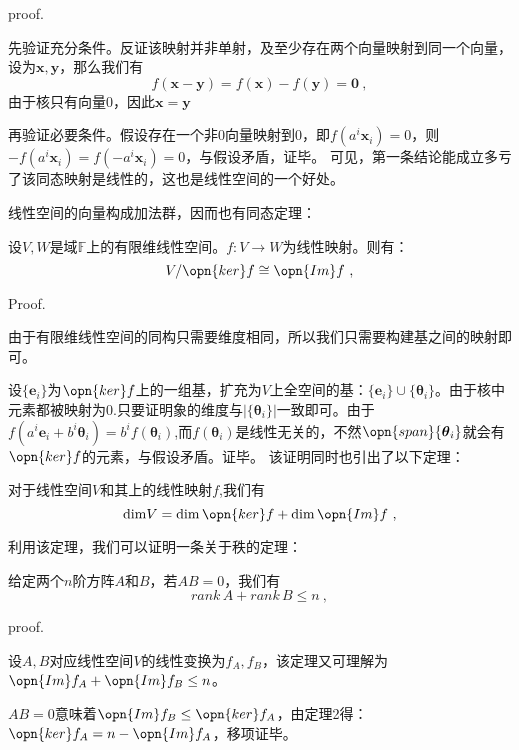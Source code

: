 proof.

先验证充分条件。反证该映射并非单射，及至少存在两个向量映射到同一个向量，设为$\boldsymbol{x,y}$，那么我们有
\begin{equation}
f(\boldsymbol{x}-\boldsymbol{y})=f(\boldsymbol x)-f(\boldsymbol y)=\boldsymbol 0~,
\end{equation}
由于核只有向量$0$，因此$\boldsymbol {x}=\boldsymbol{y}$

再验证必要条件。假设存在一个非$0$向量映射到$0$，即$f(a^i\boldsymbol x_i)=0$，则$-f(a^i\boldsymbol x_i)=f(-a^i\boldsymbol x_i)=0$，与假设矛盾，证毕。
可见，第一条结论能成立多亏了该同态映射是线性的，这也是线性空间的一个好处。

线性空间的向量构成加法群，因而也有同态定理：
\begin{theorem}{}
设$V,W$是域$\mathbb F$上的有限维线性空间。$f:V\rightarrow W$为线性映射。则有：
\begin{equation}
V/\opn{ker}f\cong \opn{Im} f~,
\end{equation}
\end{theorem}
Proof.

由于有限维线性空间的同构只需要维度相同，所以我们只需要构建基之间的映射即可。

设$\{\boldsymbol e_i\}$为$\opn{ker}f$上的一组基，扩充为$V$上全空间的基：$\{\boldsymbol e_i\}\cup \{\boldsymbol \theta_i\}$。由于核中元素都被映射为0.只要证明象的维度与$|\{\boldsymbol \theta_i\}|$一致即可。由于$f(a^i\boldsymbol e_i+b^i\boldsymbol \theta_i)=b^if(\boldsymbol \theta_i)$,而$f(\boldsymbol \theta_i)$是线性无关的，不然$\opn{span}\{\boldsymbol \theta_i\}$就会有$\opn{ker}f$的元素，与假设矛盾。证毕。
该证明同时也引出了以下定理：
\begin{lemma}{}
对于线性空间$V$和其上的线性映射$f$,我们有
\begin{equation}
\mathrm{dim}V=\mathrm{dim}\,\opn{ker}f+\mathrm {dim}\,\opn{Im}f~,
\end{equation}
\end{lemma}
利用该定理，我们可以证明一条关于秩的定理：
\begin{theorem}{}
给定两个$n$阶方阵$A$和$B$，若$AB=0$，我们有
\begin{equation}
rank\,A+rank\,B\le n~,
\end{equation}
\end{theorem}
proof.

设$A,B$对应线性空间$V$的线性变换为$f_A,f_B$，该定理又可理解为$\opn{Im}f_A+\opn{Im}f_B\le n$。

$AB=0$意味着$\opn{Im}f_B\le \opn{ker}f_A$，由定理2得：$\opn{ker}f_A=n-\opn{Im}f_A$，移项证毕。

